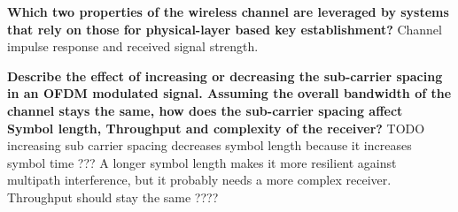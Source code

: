 \textbf{Which two properties of the wireless channel are leveraged by systems that rely on those for physical-layer based key establishment?} Channel impulse response and received signal strength.

\textbf{Describe the effect of increasing or decreasing the sub-carrier spacing in an OFDM modulated signal. Assuming the overall bandwidth of the channel stays the same, how does the sub-carrier spacing affect Symbol length, Throughput and complexity of the receiver?} TODO increasing sub carrier spacing decreases symbol length because it increases symbol time ???
A longer symbol length makes it more resilient against multipath interference, but it probably needs a more complex receiver.
Throughput should stay the same ????